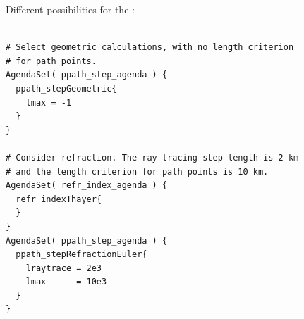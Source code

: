 \noindent
Different possibilities for the :
\begin{verbatim}

# Select geometric calculations, with no length criterion 
# for path points.
AgendaSet( ppath_step_agenda ) {
  ppath_stepGeometric{
    lmax = -1
  }
}

# Consider refraction. The ray tracing step length is 2 km 
# and the length criterion for path points is 10 km.
AgendaSet( refr_index_agenda ) {
  refr_indexThayer{
  }
}
AgendaSet( ppath_step_agenda ) {
  ppath_stepRefractionEuler{
    lraytrace = 2e3
    lmax      = 10e3
  }
}
\end{verbatim}






